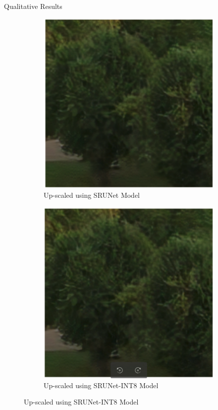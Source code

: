 \documentclass{beamer}
\begin{document}
\begin{frame}{Qualitative Results}
\begin{figure}
\begin{subfigure}{0.18\textwidth}
      \includegraphics[width=\linewidth]{static/trees_srunet.png}
      \caption{Up-scaled using SRUNet Model}
    \end{subfigure}
    \hfill
    \begin{subfigure}{0.18\textwidth}
      \includegraphics[width=\linewidth]{static/trees_srunet_int8.png}
      \caption{Up-scaled using SRUNet-INT8 Model}
    \end{subfigure}
  \end{figure}
\end{frame}
\end{document}
